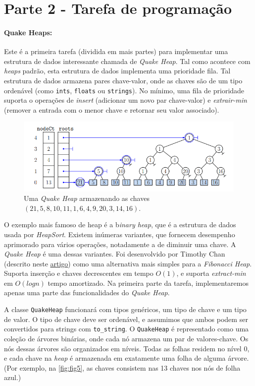\documentclass{article}
\begin{document}
\newpage
\section*{Parte 2 - Tarefa de programação}

\paragraph{Quake Heaps:}

Este é a primeira tarefa (dividida em mais partes) para implementar uma estrutura de dados interessante chamada de \textit{Quake Heap}. Tal como acontece com \textit{heaps} padrão, esta estrutura de dados implementa uma prioridade fila. Tal estrutura de dados armazena pares chave-valor, onde as chaves são de um tipo ordenável (como \texttt{ints}, \texttt{floats} ou \texttt{strings}). 
No mínimo, uma fila de prioridade suporta o operações de \textit{insert} (adicionar um novo par chave-valor) e \textit{extrair-min} (remover a entrada com o menor chave e retornar seu valor associado).

\begin{figure}[!h]
    \centering
    \includegraphics[width = 0.8\linewidth]{figures/fig5.png}
    \caption{Uma \textit{Quake Heap} armazenando as chaves $(21, 5, 8, 10, 11, 1, 6, 4, 9, 20, 3, 14, 16)$.}
    \label{fig:fig5}
\end{figure}

O exemplo mais famoso de heap é a b\textit{inary heap}, que é a estrutura de dados usada por \textit{HeapSort}. Existem inúmeras variantes, que fornecem desempenho aprimorado para vários operações, notadamente a de diminuir uma chave. A \textit{Quake Heap} é uma dessas variantes. Foi desenvolvido por Timothy Chan (descrito neste \href{http://tmc.web.engr.illinois.edu/heap_ianfest.pdf}{artigo}) como uma alternativa mais simples para a \textit{Fibonacci Heap}. Suporta inserção e chaves decrescentes em tempo $O(1)$, e suporta \textit{extract-min} em $O(log n)$ tempo amortizado. 
Na primeira parte da tarefa, implementaremos apenas uma parte das funcionalidades do \textit{Quake Heap}.

A classe \texttt{QuakeHeap} funcionará com tipos genéricos, um tipo de chave
e um tipo de valor. O tipo de chave deve ser ordenável, e assumimos que ambos podem ser convertidos para strings com \texttt{to\_string}. 
O \texttt{QuakeHeap}  é representado como uma coleção de árvores binárias, onde cada nó armazena um par de valores-chave. Os nós dessas árvores são organizados em níveis. Todas as folhas residem no nível 0, e cada chave na \textit{heap} é armazenada em exatamente uma folha de alguma árvore. (Por exemplo, na \autoref{fig:fig5},
as chaves consistem nas 13 chaves nos nós de folha azul.)
\end{document}
